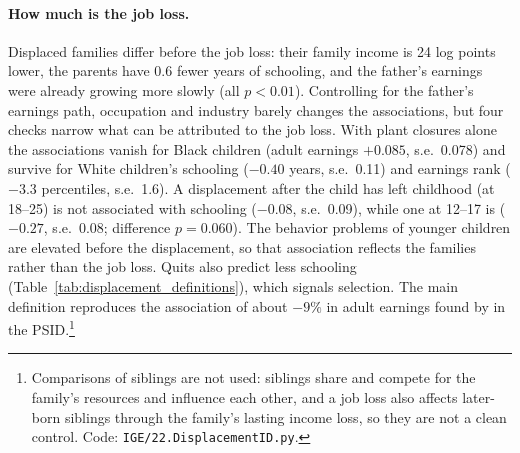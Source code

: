 \paragraph{How much is the job loss.} Displaced families differ before the job loss: their family income is 24 log
points lower, the parents have 0.6 fewer years of schooling, and the father's earnings were already growing more slowly
(all $p<0.01$). Controlling for the father's earnings path, occupation and industry barely changes the associations, but
four checks narrow what can be attributed to the job loss. With plant closures alone the associations vanish for Black
children (adult earnings $+0.085$, s.e.\ 0.078) and survive for White children's schooling ($-0.40$ years, s.e.\ 0.11)
and earnings rank ($-3.3$ percentiles, s.e.\ 1.6). A displacement after the child has left childhood (at 18--25) is not
associated with schooling ($-0.08$, s.e.\ 0.09), while one at 12--17 is ($-0.27$, s.e.\ 0.08; difference $p=0.060$).
The behavior problems of younger children are elevated before the displacement, so that association reflects the
families rather than the job loss. Quits also predict less schooling (Table~\ref{tab:displacement_definitions}), which
signals selection. The main definition reproduces the association of about $-9\%$ in adult earnings found by
\citet{page2009parental} in the PSID.\footnote{Comparisons of siblings are not used: siblings share and compete for the
family's resources and influence each other, and a job loss also affects later-born siblings through the family's
lasting income loss, so they are not a clean control. Code: \texttt{IGE/22.DisplacementID.py}.}



